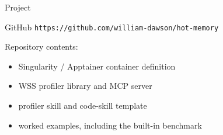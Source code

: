 \documentclass[aspectratio=169]{beamer}
\begin{document}
\begin{frame}{Project}
  \begin{block}{GitHub}
    \texttt{https://github.com/william-dawson/hot-memory}
  \end{block}

  \vspace{0.5em}
  Repository contents:
  \begin{itemize}
    \item Singularity / Apptainer container definition
    \item WSS profiler library and MCP server
    \item profiler skill and code-skill template
    \item worked examples, including the built-in benchmark
  \end{itemize}
\end{frame}
\end{document}
